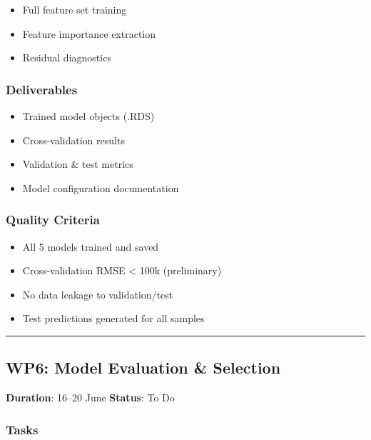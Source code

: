 \documentclass[
  english,
  letterpaper,
  DIV=11,
  numbers=noendperiod]{scrreprt}
\providecommand{\tightlist}{%
  \setlength{\itemsep}{0pt}\setlength{\parskip}{0pt}}
\begin{document}
\begin{itemize}
\tightlist
\item
  Full feature set training
\item
  Feature importance extraction
\item
  Residual diagnostics
\end{itemize}

\subsubsection{Deliverables}\label{deliverables-5}

\begin{itemize}
\tightlist
\item
  Trained model objects (.RDS)
\item
  Cross-validation results
\item
  Validation \& test metrics
\item
  Model configuration documentation
\end{itemize}

\subsubsection{Quality Criteria}\label{quality-criteria-4}

\begin{itemize}
\tightlist
\item[$\square$]
  All 5 models trained and saved
\item[$\square$]
  Cross-validation RMSE \textless{} 100k (preliminary)
\item[$\square$]
  No data leakage to validation/test
\item[$\square$]
  Test predictions generated for all samples
\end{itemize}

\begin{center}\rule{0.5\linewidth}{0.5pt}\end{center}

\subsection{WP6: Model Evaluation \&
Selection}\label{wp6-model-evaluation-selection}

\textbf{Duration}: 16--20 June \textbar{} \textbf{Status}: To Do

\subsubsection{Tasks}\label{tasks-4}
\end{document}
